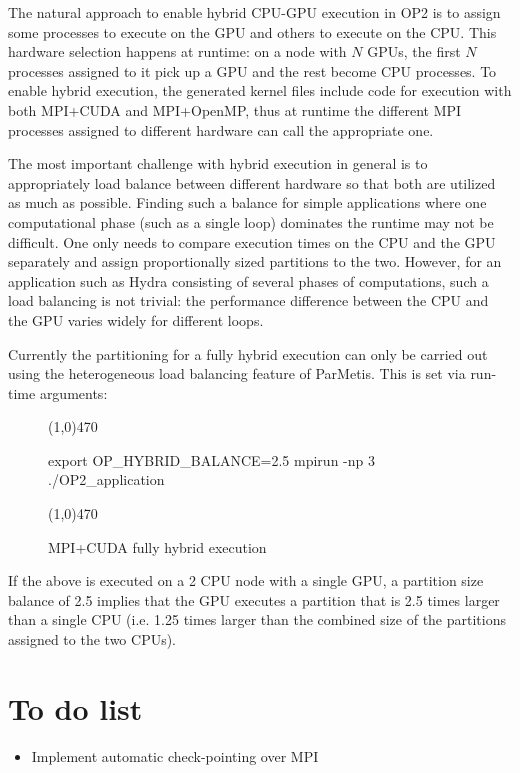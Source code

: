 \documentclass[11pt]{article}
\begin{document}
The natural approach to enable hybrid CPU-GPU execution in OP2 is to assign some processes to execute on the GPU
and others to execute on the CPU. This hardware selection happens at runtime: on a node with $N$ GPUs, the first $N$
processes assigned to it pick up a GPU and the rest become CPU processes. To enable hybrid execution, the generated
kernel files include code for execution with both MPI+CUDA and MPI+OpenMP, thus at runtime the different MPI processes
assigned to different hardware can call the appropriate one.

The most important challenge with hybrid execution in general is to appropriately load balance between different
hardware so that both are utilized as much as possible. Finding such a balance for simple applications where one
computational phase (such as a single loop) dominates the runtime may not be difficult. One only needs to compare
execution times on the CPU and the GPU separately and assign proportionally sized partitions to the two. However, for an
application such as Hydra consisting of several phases of computations, such a load balancing is not trivial: the
performance difference between the CPU and the GPU varies widely for different loops.

Currently the partitioning for a fully hybrid execution can only be carried out using the heterogeneous load balancing
feature of ParMetis. This is set via run-time arguments:

\begin{figure}[h]\small
\vspace{-0pt}\noindent\line(1,0){470}\vspace{-10pt}
\begin{pyglist}[language=bash]
export OP_HYBRID_BALANCE=2.5
mpirun -np 3 ./OP2_application
\end{pyglist}
\vspace{-10pt}\noindent\line(1,0){470}\vspace{-10pt}
\caption{\small MPI+CUDA fully hybrid execution}
\normalsize\vspace{-0pt}\label{fig:hybrid}
\end{figure}

\noindent If the above is executed on a 2 CPU node with a single GPU, a partition size balance of 2.5 implies that the
GPU executes a partition that is 2.5 times larger than a single CPU (i.e. 1.25 times larger than the combined size of
the partitions assigned to the two CPUs).




\section{To do list}
\begin{itemize}
\item Implement automatic check-pointing over MPI
\end{itemize}
\end{document}
